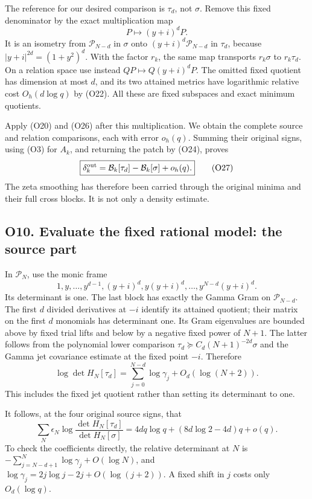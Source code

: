 \documentclass[
  11pt,
]{article}
\begin{document}
The reference for our desired comparison is \(\tau_d\), not \(\sigma\).
Remove this fixed denominator by the exact multiplication map \[
P\longmapsto(y+i)^dP.
\] It is an isometry from \(\mathcal P_{N-d}\) in \(\sigma\) onto
\((y+i)^d\mathcal P_{N-d}\) in \(\tau_d\), because
\(|y+i|^{2d}=(1+y^2)^d\). With the factor \(r_k\), the same map
transports \(r_k\sigma\) to \(r_k\tau_d\). On a relation space use
instead \(QP\mapsto Q(y+i)^dP\). The omitted fixed quotient has
dimension at most \(d\), and its two attained metrics have logarithmic
relative cost \(O_h(d\log q)\) by (O22). All these are fixed subspaces
and exact minimum quotients.

Apply (O20) and (O26) after this multiplication. We obtain the complete
source and relation comparisons, each with error \(o_h(q)\). Summing
their original signs, using (O3) for \(A_k\), and returning the patch by
(O24), proves \[
\boxed{\delta_k^{\rm out}
=\mathcal B_k[\tau_d]-\mathcal B_k[\sigma]+o_h(q).}\tag{O27}
\] The zeta smoothing has therefore been carried through the original
minima and their full cross blocks. It is not only a density estimate.

\subsection{O10. Evaluate the fixed rational model: the source
part}\label{o10.-evaluate-the-fixed-rational-model-the-source-part}

In \(\mathcal P_N\), use the monic frame \[
1,y,\ldots,y^{d-1},(y+i)^d,y(y+i)^d,\ldots,y^{N-d}(y+i)^d.
\] Its determinant is one. The last block has exactly the Gamma Gram on
\(\mathcal P_{N-d}\). The first \(d\) divided derivatives at \(-i\)
identify its attained quotient; their matrix on the first \(d\)
monomials has determinant one. Its Gram eigenvalues are bounded above by
fixed trial lifts and below by a negative fixed power of \(N+1\). The
latter follows from the polynomial lower comparison
\(\tau_d\succeq C_d(N+1)^{-2d}\sigma\) and the Gamma jet covariance
estimate at the fixed point \(-i\). Therefore \[
\log\det H_N[\tau_d]
=\sum_{j=0}^{N-d}\log\gamma_j+O_d(\log(N+2)).\tag{O28}
\] This includes the fixed jet quotient rather than setting its
determinant to one.

It follows, at the four original source signs, that \[
\boxed{\sum_N\epsilon_N\log\frac{\det H_N[\tau_d]}{\det H_N[\sigma]}
=4dq\log q+(8d\log2-4d)q+o(q).}\tag{O29}
\] To check the coefficients directly, the relative determinant at \(N\)
is \(-\sum_{j=N-d+1}^{N}\log\gamma_j+O(\log N)\), and
\(\log\gamma_j=2j\log j-2j+O(\log(j+2))\). A fixed shift in \(j\) costs
only \(O_d(\log q)\).
\end{document}
